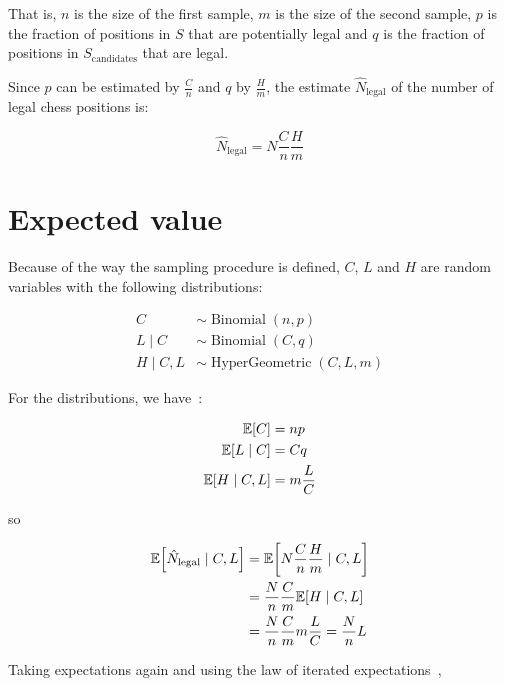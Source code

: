 \documentclass[a4paper,10pt]{article}
\DeclarePairedDelimiter\bracket{[}{]}
\newcommand{\E}[1]{\mathbb{E}\bracket*{#1}}
\begin{document}
That is, $n$ is the size of the first sample, $m$ is the size of the second
sample, $p$ is the fraction of positions in $S$ that are potentially
legal and $q$ is the fraction of positions in $S_{\text{candidates}}$ that are legal.

Since $p$ can be estimated by $\frac{C}{n}$ and $q$ by $\frac{H}{m}$, the
estimate $\hat{N}_{\text{legal}}$ of the number of legal chess positions is:

\begin{equation}
  \hat{N}_{\text{legal}} = N \frac{C}{n} \frac{H}{m}
\end{equation}

\section*{Expected value}

Because of the way the sampling procedure is defined, $C$, $L$ and $H$ are
random variables with the following distributions:

\begin{align}
  C & \sim \operatorname{Binomial}(n, p)                     \\
  L \mid C & \sim \operatorname{Binomial}(C, q)              \\
  H \mid C,L & \sim \operatorname{HyperGeometric}(C, L, m)
\end{align}

For the distributions, we have~\cite{wiki:binomial,wiki:hypergeom}:

\begin{align}
  \E{C} &= np                           \\
  \E{L \mid C} &= Cq                    \\
  \E{H \mid C,L} &= m \frac{L}{C}
\end{align}

so

\begin{align}
  \E{\hat{N}_{\text{legal}} \mid C,L} & = \E{N \frac{C}{n} \frac{H}{m} \mid C,L}   \\
    &= \frac{N}{n} \frac{C}{m} \E{H \mid C,L}                                      \\
    &= \frac{N}{n} \frac{C}{m} m \frac{L}{C} = \frac{N}{n} L
\end{align}

Taking expectations again and using the law of iterated
expectations~\cite{wiki:totalexpect},
\end{document}
